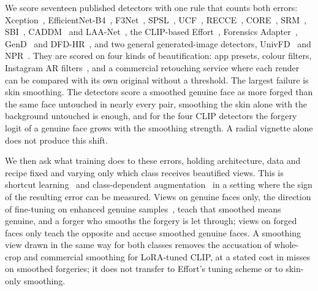 \documentclass[conference]{IEEEtran}
\begin{document}
We score seventeen published detectors with one rule that counts both errors: Xception~\cite{xception},
EfficientNet-B4~\cite{efficientnet}, F3Net~\cite{f3net}, SPSL~\cite{spsl}, UCF~\cite{ucf}, RECCE~\cite{recce}, CORE~\cite{core},
SRM~\cite{srm}, SBI~\cite{sbi}, CADDM~\cite{caddm} and LAA-Net~\cite{laanet}, the CLIP-based Effort~\cite{effort}, Forensics
Adapter~\cite{forensicsadapter}, GenD~\cite{gend2026} and DFD-HR~\cite{dfdhr2026}, and two general generated-image detectors,
UnivFD~\cite{univfd} and NPR~\cite{npr}. They are scored on four kinds of beautification: app presets, colour filters, Instagram
AR filters~\cite{openfilter2022}, and a commercial retouching service where each render can be compared with its own original
without a threshold. The largest failure is skin smoothing. The detectors score a smoothed genuine face as more forged than the
same face untouched in nearly every pair, smoothing the skin alone with the background untouched is enough, and for the four
CLIP detectors the forgery logit of a genuine face grows with the smoothing strength. A radial vignette alone does not produce
this shift.

We then ask what training does to these errors, holding architecture, data and recipe fixed and varying only which class
receives beautified views. This is shortcut learning~\cite{geirhos2020} and class-dependent
augmentation~\cite{balestriero2022} in a setting where the sign of the resulting error can be measured. Views on genuine faces
only, the direction of fine-tuning on enhanced genuine samples~\cite{saeed2025}, teach that smoothed means genuine, and a forger
who smooths the forgery is let through; views on forged faces only teach the opposite and accuse smoothed genuine faces. A
smoothing view drawn in the same way for both classes removes the accusation of whole-crop and commercial smoothing for
LoRA-tuned CLIP, at a stated cost in misses on smoothed forgeries; it does not transfer to Effort's tuning scheme or to
skin-only smoothing.
\end{document}
